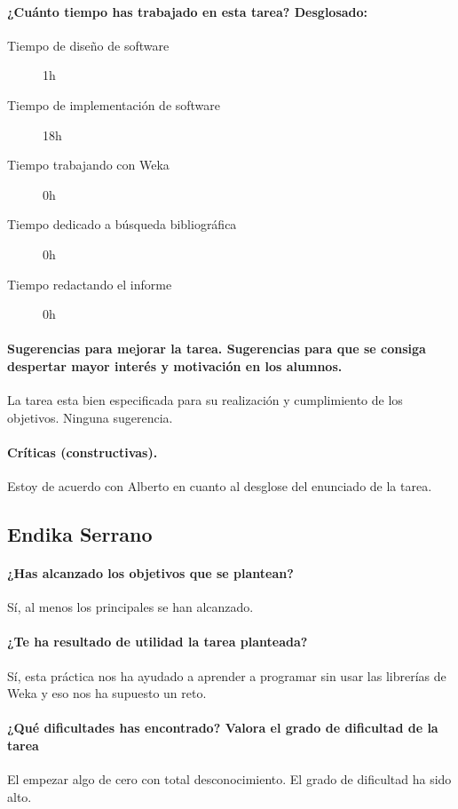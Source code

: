 \documentclass[11pt, titlepage,a4paper]{article}
\begin{document}
\paragraph{¿Cuánto tiempo has trabajado en esta tarea? Desglosado:\\}
\begin{description}
	\item[Tiempo de diseño de software] 1h
	\item[Tiempo de implementación de software] 18h
	\item[Tiempo trabajando con Weka] 0h
	\item[Tiempo dedicado a búsqueda bibliográfica] 0h
	\item[Tiempo redactando el informe] 0h
\end{description}

\paragraph{Sugerencias para mejorar la tarea. Sugerencias para que se consiga despertar mayor
interés y motivación en los alumnos.\\}
La tarea esta bien especificada para su realización y cumplimiento de los
objetivos. Ninguna sugerencia.


\paragraph{Críticas (constructivas).\\}
Estoy de acuerdo con Alberto en cuanto al desglose del enunciado de la tarea.

\subsection{Endika Serrano}
\paragraph{¿Has alcanzado los objetivos que se plantean?\\}
Sí, al menos los principales se han alcanzado.
\paragraph{¿Te ha resultado de utilidad la tarea planteada?\\}
Sí, esta práctica nos ha ayudado a aprender a programar sin usar las librerías de Weka y eso nos ha supuesto un reto.
 \paragraph{¿Qué dificultades has encontrado? Valora el grado de dificultad de
la tarea\\}
El empezar algo de cero con total desconocimiento. El grado de dificultad ha
sido alto.
\end{document}
